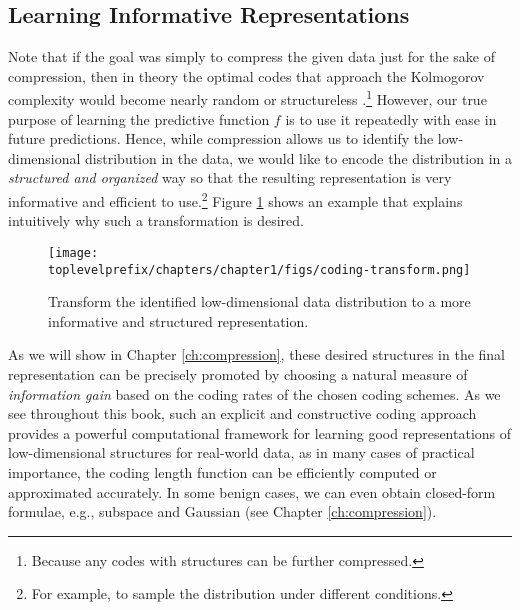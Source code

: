 \documentclass[\toplevelprefix/book-main.tex]{subfiles}
\begin{document}
\subsection{Learning Informative Representations}
Note that if the goal was simply to compress the given data just for the sake of compression, then in theory the optimal codes that approach the Kolmogorov complexity would become nearly random or structureless \cite{Chaitin-1966}.\footnote{Because any codes with structures can be further compressed.} However, our true purpose of learning the predictive function $f$ is to use it repeatedly with ease in future predictions. Hence, while compression allows us to identify the low-dimensional distribution in the data, we would like to encode the distribution in a {\em structured and organized} way so that the resulting representation is very informative and efficient to use.\footnote{For example, to sample the distribution under different conditions.} Figure \ref{fig:expansion} shows an example that explains intuitively why such a transformation is desired. 

\begin{figure}
    \centering
    \texttt{[image: \\toplevelprefix/chapters/chapter1/figs/coding-transform.png]}
    \caption{Transform the identified low-dimensional data distribution to a more informative and structured representation.}
    \label{fig:expansion}
\end{figure}
As we will show in Chapter \ref{ch:compression}, these desired structures in the final representation can be precisely promoted by choosing a natural measure of {\em information gain} based on the coding rates of the chosen coding schemes. As we see throughout this book, such an explicit and constructive coding approach provides a powerful computational framework for learning good representations of low-dimensional structures for real-world data, as in many cases of practical importance, the coding length function can be efficiently computed or approximated accurately. In some benign cases, we can even obtain closed-form formulae, e.g., subspace and Gaussian (see Chapter \ref{ch:compression}). 
\end{document}
